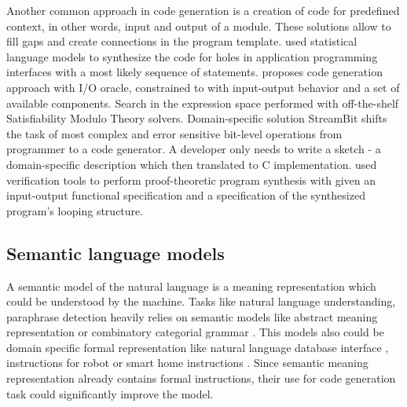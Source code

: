 Another common approach in code generation is a creation of code for predefined context, in other words, input and output of a module. These solutions allow to fill gaps and create connections in the program template. \cite{Raychev2014} used statistical language models to synthesize the code for holes in application programming interfaces with a most likely sequence of statements. \cite{Jha2010} proposes code generation approach with I/O oracle, constrained to with input-output behavior and a set of available components. Search in the expression space performed with off-the-shelf Satisfiability Modulo Theory solvers. Domain-specific solution StreamBit \parencite{Solar-Lezama2005} shifts the task of most complex and error sensitive bit-level operations from programmer to a code generator. A developer only needs to write a sketch - a domain-specific description which then translated to C implementation. \cite{Srivastava2010} used verification tools to perform proof-theoretic program synthesis with given an input-output functional specification and a specification of the synthesized program’s looping structure.

\subsection{Semantic language models}
A semantic model of the natural language is a meaning representation which could be understood by the machine. Tasks like natural language understanding, paraphrase detection heavily relies on semantic models like abstract meaning representation \parencite{banarescu2013abstract} or combinatory categorial grammar \parencite{Clark2007}. This models also could be domain specific formal representation like natural language database interface \parencite{Zettlemoyer2012, berant2013semantic}, instructions for robot \parencite{artzi2013weakly} or smart home instructions \parencite{quirk2015language}. Since semantic meaning representation already contains formal instructions, their use for code generation task could significantly improve the model. 

